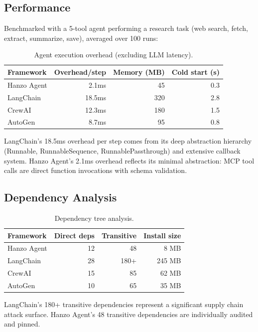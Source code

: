 \subsection{Performance}

Benchmarked with a 5-tool agent performing a research task (web search, fetch, extract, summarize, save), averaged over 100 runs:

\begin{table}[H]
\centering
\caption{Agent execution overhead (excluding LLM latency).}
\footnotesize
\begin{tabular}{@{}lrrr@{}}
\toprule
Framework & Overhead/step & Memory (MB) & Cold start (s) \\
\midrule
Hanzo Agent & 2.1ms & 45 & 0.3 \\
LangChain & 18.5ms & 320 & 2.8 \\
CrewAI & 12.3ms & 180 & 1.5 \\
AutoGen & 8.7ms & 95 & 0.8 \\
\bottomrule
\end{tabular}
\end{table}

LangChain's 18.5ms overhead per step comes from its deep abstraction hierarchy (Runnable, RunnableSequence, RunnablePassthrough) and extensive callback system. Hanzo Agent's 2.1ms overhead reflects its minimal abstraction: MCP tool calls are direct function invocations with schema validation.

\subsection{Dependency Analysis}

\begin{table}[H]
\centering
\caption{Dependency tree analysis.}
\footnotesize
\begin{tabular}{@{}lrrr@{}}
\toprule
Framework & Direct deps & Transitive & Install size \\
\midrule
Hanzo Agent & 12 & 48 & 8 MB \\
LangChain & 28 & 180+ & 245 MB \\
CrewAI & 15 & 85 & 62 MB \\
AutoGen & 10 & 65 & 35 MB \\
\bottomrule
\end{tabular}
\end{table}

LangChain's 180+ transitive dependencies represent a significant supply chain attack surface. Hanzo Agent's 48 transitive dependencies are individually audited and pinned.


